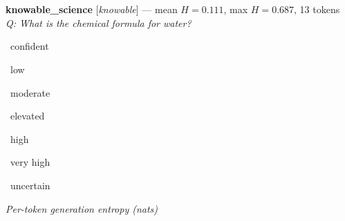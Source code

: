\\%
%
\\%
%
%

\bigskip

\noindent\textbf{knowable\_science} [\textit{knowable}] --- mean $H=0.111$, max $H=0.687$, 13 tokens\\[2pt]
\textit{Q: What is the chemical formula for water?}\\[4pt]
\noindent%
%

\bigskip

\noindent\footnotesize%
\colorbox{ent0bg}{\textcolor{ent0fg}{\strut\ confident\ }}
\colorbox{ent1bg}{\textcolor{ent1fg}{\strut\ low\ }}
\colorbox{ent2bg}{\textcolor{ent2fg}{\strut\ moderate\ }}
\colorbox{ent3bg}{\textcolor{ent3fg}{\strut\ elevated\ }}
\colorbox{ent4bg}{\textcolor{ent4fg}{\strut\ high\ }}
\colorbox{ent5bg}{\textcolor{ent5fg}{\strut\ very high\ }}
\colorbox{ent6bg}{\textcolor{ent6fg}{\strut\ uncertain\ }}
\hfill \textit{Per-token generation entropy (nats)}